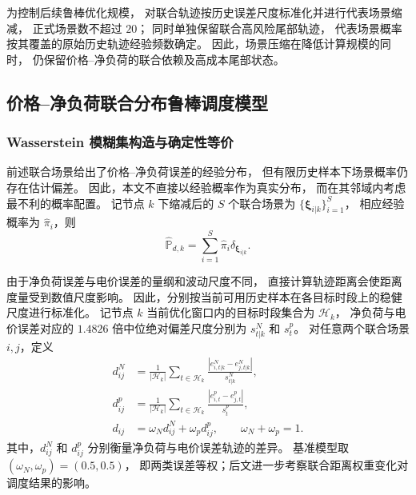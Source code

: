 \documentclass[zihao=-4,a4paper,UTF8,fontset=none]{ctexart}
\begin{document}
为控制后续鲁棒优化规模，
对联合轨迹按历史误差尺度标准化并进行代表场景缩减，
正式场景数不超过 $20$；
同时单独保留联合高风险尾部轨迹，
代表场景概率按其覆盖的原始历史轨迹经验频数确定。
因此，场景压缩在降低计算规模的同时，
仍保留价格--净负荷的联合依赖及高成本尾部状态。

\subsection{价格--净负荷联合分布鲁棒调度模型}
\subsubsection{Wasserstein 模糊集构造与确定性等价}

前述联合场景给出了价格--净负荷误差的经验分布，
但有限历史样本下场景概率仍存在估计偏差。
因此，本文不直接以经验概率作为真实分布，
而在其邻域内考虑最不利的概率配置。
记节点 $k$ 下缩减后的 $S$ 个联合场景为
$\{\boldsymbol{\xi}_{i|k}\}_{i=1}^{S}$，
相应经验概率为 $\widehat\pi_i$，则
\begin{equation}
    \widehat{\mathbb P}_{d,k}
    =
    \sum_{i=1}^{S}
    \widehat\pi_i
    \delta_{\boldsymbol{\xi}_{i|k}} .
    \label{eq:q4_empirical_distribution}
\end{equation}

由于净负荷误差与电价误差的量纲和波动尺度不同，
直接计算轨迹距离会使距离度量受到数值尺度影响。
因此，分别按当前可用历史样本在各目标时段上的稳健尺度进行标准化。
记节点 $k$ 当前优化窗口内的目标时段集合为 $\mathcal H_k$，
净负荷与电价误差对应的 $1.4826$ 倍中位绝对偏差尺度分别为
$s_{t|k}^{N}$ 和 $s_t^{p}$。
对任意两个联合场景 $i,j$，定义
\begin{equation}
\begin{aligned}
    d_{ij}^{N}
    &=
    \frac{1}{|\mathcal H_k|}
    \sum_{t\in\mathcal H_k}
    \frac{
        \left|e_{i,t|k}^{N}-e_{j,t|k}^{N}\right|
    }{s_{t|k}^{N}},
    \\[2pt]
    d_{ij}^{p}
    &=
    \frac{1}{|\mathcal H_k|}
    \sum_{t\in\mathcal H_k}
    \frac{
        \left|e_{i,t}^{p}-e_{j,t}^{p}\right|
    }{s_t^{p}},
    \\[2pt]
    d_{ij}
    &=
    \omega_N d_{ij}^{N}
    +
    \omega_p d_{ij}^{p},
    \qquad
    \omega_N+\omega_p=1 .
\end{aligned}
\label{eq:q4_joint_distance}
\end{equation}
其中，$d_{ij}^{N}$ 和 $d_{ij}^{p}$ 分别衡量净负荷与电价误差轨迹的差异。
基准模型取
$(\omega_N,\omega_p)=(0.5,0.5)$，
即两类误差等权；后文进一步考察联合距离权重变化对调度结果的影响。
\end{document}
